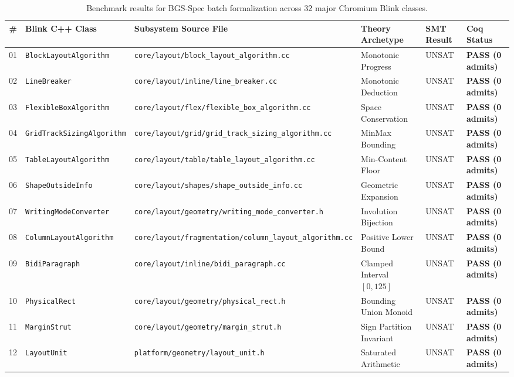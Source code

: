 \documentclass[10pt,journal,compsoc]{IEEEtran}
\begin{document}
\begin{table}[t]
\centering
\caption{Benchmark results for BGS-Spec batch formalization across 32 major Chromium Blink classes.}
\label{tab:benchmark}
\tiny
\renewcommand{\arraystretch}{0.85}
\begin{tabular*}{\textwidth}{@{\extracolsep{\fill}}rlllll}
\toprule
\textbf{\#} & \textbf{Blink C++ Class} & \textbf{Subsystem Source File} & \textbf{Theory Archetype} & \textbf{SMT Result} & \textbf{Coq Status} \\
\midrule
01 & \texttt{BlockLayoutAlgorithm} & \texttt{core/layout/block\_layout\_algorithm.cc} & Monotonic Progress & UNSAT & \textbf{PASS (0 admits)} \\
02 & \texttt{LineBreaker} & \texttt{core/layout/inline/line\_breaker.cc} & Monotonic Deduction & UNSAT & \textbf{PASS (0 admits)} \\
03 & \texttt{FlexibleBoxAlgorithm} & \texttt{core/layout/flex/flexible\_box\_algorithm.cc} & Space Conservation & UNSAT & \textbf{PASS (0 admits)} \\
04 & \texttt{GridTrackSizingAlgorithm} & \texttt{core/layout/grid/grid\_track\_sizing\_algorithm.cc} & MinMax Bounding & UNSAT & \textbf{PASS (0 admits)} \\
05 & \texttt{TableLayoutAlgorithm} & \texttt{core/layout/table/table\_layout\_algorithm.cc} & Min-Content Floor & UNSAT & \textbf{PASS (0 admits)} \\
06 & \texttt{ShapeOutsideInfo} & \texttt{core/layout/shapes/shape\_outside\_info.cc} & Geometric Expansion & UNSAT & \textbf{PASS (0 admits)} \\
07 & \texttt{WritingModeConverter} & \texttt{core/layout/geometry/writing\_mode\_converter.h} & Involution Bijection & UNSAT & \textbf{PASS (0 admits)} \\
08 & \texttt{ColumnLayoutAlgorithm} & \texttt{core/layout/fragmentation/column\_layout\_algorithm.cc} & Positive Lower Bound & UNSAT & \textbf{PASS (0 admits)} \\
09 & \texttt{BidiParagraph} & \texttt{core/layout/inline/bidi\_paragraph.cc} & Clamped Interval $[0, 125]$ & UNSAT & \textbf{PASS (0 admits)} \\
10 & \texttt{PhysicalRect} & \texttt{core/layout/geometry/physical\_rect.h} & Bounding Union Monoid & UNSAT & \textbf{PASS (0 admits)} \\
11 & \texttt{MarginStrut} & \texttt{core/layout/geometry/margin\_strut.h} & Sign Partition Invariant & UNSAT & \textbf{PASS (0 admits)} \\
12 & \texttt{LayoutUnit} & \texttt{platform/geometry/layout\_unit.h} & Saturated Arithmetic & UNSAT & \textbf{PASS (0 admits)} \\

\end{tabular*}
\end{table}
\end{document}
